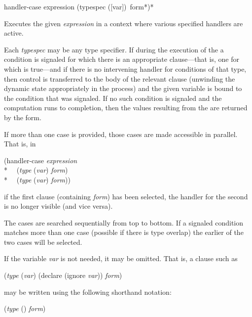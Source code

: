 \begin{defmac}
handler-case expression {(typespec ([var]) {\,form}*)}*

  Executes the given {\it expression} in a context where various specified handlers are active.

  Each {\it typespec} may be any type specifier. If during the execution of the 
  a condition is signaled for which there is an appropriate clause---that is, one
  for which  is true---and if there is no intervening
  handler for conditions of that type, then control is transferred to the body
  of the relevant clause (unwinding the dynamic state appropriately in the
  process) and the given variable  is bound to the condition that was signaled. If
  no such condition is signaled and the computation runs to completion, then
  the values resulting from the  are returned by the  form.

  If more than one case is provided, those cases are made accessible in
  parallel. That is, in
\begin{lisp}
(handler-case {\it expression} \\*
~~({\it type} ({\it var}) {\it form}) \\*
~~({\it type} ({\it var}) {\it form}))
\end{lisp}
  if the first clause (containing {\it form}) has been selected, the handler
  for the second is no longer visible (and vice versa).

  The cases are searched sequentially from top to bottom. If a signaled condition
  matches more than one case (possible if there is type
  overlap) the earlier of the two cases will be selected.



  If the variable {\it var} is not needed, it may be omitted. That is, a clause such as
\begin{lisp}
({\it type} ({\it var}) (declare (ignore {\it var})) {\it form})
\end{lisp}
may be written using the following shorthand notation:
\begin{lisp}
({\it type} () {\it form})
\end{lisp}


\end{defmac}
